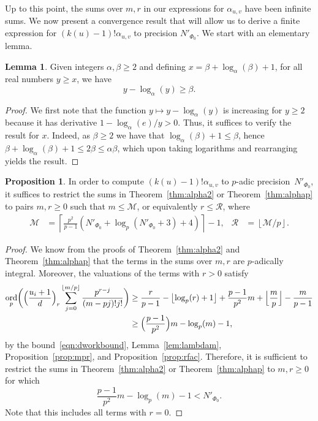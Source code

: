\documentclass[a4paper,11pt]{article}
\numberwithin{equation}{section}
\providecommand{\floor}[1]{\left\lfloor#1\right\rfloor}   %
\providecommand{\floorBig}[1]{\Bigl\lfloor#1\Bigr\rfloor} %
\providecommand{\ceil}[1]{\left\lceil#1\right\rceil}   %
\DeclareMathOperator{\ord}{ord}          %
\theoremstyle{definition}
\newtheorem{lem}[thm]{Lemma}
\newtheorem{prop}[thm]{Proposition}
\begin{document}
Up to this point, the sums over $m,r$ in our expressions 
for $\alpha_{u,v}$ have been infinite sums.  We now present 
a convergence result that will allow us to derive a finite 
expression for $(k(u)-1)!\alpha_{u,v}$ to precision $N'_{\Phi_0}$.
We start with an elementary lemma.

\begin{lem} \label{lem:log}
Given integers $\alpha, \beta \geq 2$ and defining 
$x = \beta + \log_{\alpha}(\beta) + 1$, 
for all real numbers $y \geq x$,
we have 
\begin{equation*}
y - \log_{\alpha}(y) \geq \beta.
\end{equation*}
\end{lem}

\begin{proof}
We first note that the function $y \mapsto y - \log_{\alpha}(y)$ is increasing 
for $y \geq 2$ because it has derivative $1 - \log_{\alpha}(e)/y > 0$.  Thus, 
it suffices to verify the result for $x$.  Indeed, as $\beta \geq 2$ we have 
that $\log_{\alpha}(\beta) + 1 \leq \beta$, hence 
$\beta + \log_{\alpha}(\beta) + 1 \leq 2 \beta \leq \alpha \beta$,
which upon taking logarithms and rearranging yields the result.
\end{proof}


\begin{prop} \label{prop:MR}
In order to compute $(k(u)-1)!\alpha_{u,v}$ to $p$-adic precision~$N'_{\Phi_0}$, 
it suffices to restrict the sums in Theorem~\ref{thm:alpha2} or 
Theorem~\ref{thm:alphap} to pairs $m,r \geq 0$ such that $m \leq \mathcal{M}$, 
or equivalently $r \leq \mathcal{R}$, where 
\begin{align*}
\mathcal{M} &= \ceil{\frac{p^2}{p-1}(N'_{\Phi_0}+\log_p(N'_{\Phi_0}+3)+4)} - 1,
&\mathcal{R} &= \floor{\mathcal{M}/p}.
\end{align*}
\end{prop}

\begin{proof}
We know from the proofs of Theorem~\ref{thm:alpha2} and 
Theorem~\ref{thm:alphap} that the terms in the sums over $m,r$ are 
$p$-adically integral. Moreover, the valuations of the terms with 
$r > 0$ satisfy
\begin{align*}
\ord_p \biggl( \Bigl( \frac{u_i+1}{d} \Bigr)_r 
               \sum_{j=0}^{\floor{m/p}} \frac{p^{r-j}}{(m-pj)!j!} \biggr) 
&\geq \frac{r}{p-1} - \floor{\log_p(r)+1} 
      + \frac{p-1}{p^2} m + \floorBig{\frac{m}{p}} - \frac{m}{p-1} \\
&\geq \Bigl( \frac{p-1}{p^2} \Bigr) m - \log_p(m) - 1,
\end{align*}
by the bound~\eqref{eqn:dworkbound}, Lemma~\ref{lem:lambdam}, 
Proposition~\ref{prop:mpr}, and Proposition~\ref{prop:rfac}. 
Therefore, it is sufficient to restrict the sums in Theorem~\ref{thm:alpha2} 
or Theorem~\ref{thm:alphap} to $m,r \geq 0$ for which 
\begin{equation*}
\frac{p-1}{p^2} m - \log_p(m) - 1 < N'_{\Phi_0}.
\end{equation*}
Note that this includes all terms with $r = 0$.
\end{proof}
\end{document}
